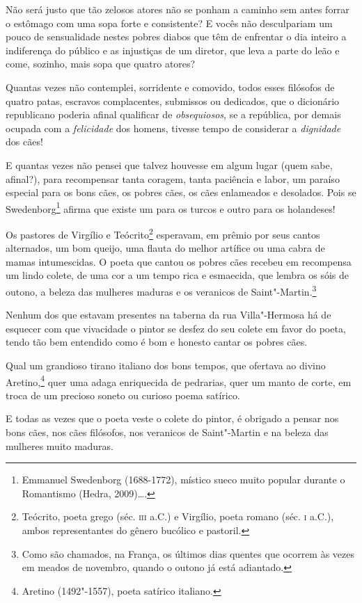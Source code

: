 Não será justo que tão zelosos atores não se ponham a caminho sem antes
forrar o estômago com uma sopa forte e consistente? E vocês não
desculpariam um pouco de sensualidade nestes pobres diabos que têm de
enfrentar o dia inteiro a indiferença do público e as injustiças de um
diretor, que leva a parte do leão e come, sozinho, mais sopa que
quatro atores?

Quantas vezes não contemplei, sorridente e comovido, todos esses
filósofos de quatro patas, escravos complacentes, submissos ou
dedicados, que o dicionário republicano poderia afinal qualificar de
\textit{obsequiosos}, se a república, por demais ocupada com a \textit{felicidade} dos
homens, tivesse tempo de considerar a \textit{dignidade} dos cães!

E quantas vezes não pensei que talvez houvesse em algum lugar (quem
sabe, afinal?), para recompensar tanta coragem, tanta paciência e
labor, um paraíso especial para os bons cães, os pobres cães, os cães
enlameados e desolados. Pois se Swedenborg\protect\footnote{ Emmanuel 
Swedenborg (1688-1772), místico sueco muito popular durante o Romantismo (Hedra, 2009)\ldots.}
afirma que existe um para os turcos e outro para os holandeses!

Os pastores de Virgílio e Teócrito\protect\footnote{ Teócrito, poeta grego (séc. 
\textsc{iii} a.C.) e Virgílio, poeta romano (séc. \textsc{i} a.C.), 
ambos representantes do gênero bucólico e pastoril.} esperavam, em
prêmio por seus cantos alternados, um bom queijo, uma flauta do melhor
artífice ou uma cabra de mamas intumescidas. O poeta que cantou os
pobres cães recebeu em recompensa um lindo colete, de uma cor a um
tempo rica e esmaecida, que lembra os sóis de outono, a beleza das
mulheres maduras e os veranicos de Saint"-Martin.\protect\footnote{ Como são chamados, na França, os
últimos dias quentes que ocorrem às vezes em meados de novembro, quando
o outono já está adiantado.}

Nenhum dos que estavam presentes na taberna da rua Villa"-Hermosa
há de esquecer com que vivacidade o pintor se desfez do seu colete em favor
do poeta, tendo tão bem entendido como é bom e honesto cantar os pobres
cães.

Qual um grandioso tirano italiano dos bons tempos, que ofertava ao divino
Aretino,\protect\footnote{ Aretino (1492"-1557), poeta satírico italiano.}
quer uma adaga enriquecida de pedrarias,
quer um manto de corte, em troca de um precioso soneto ou curioso
poema satírico.

E todas as vezes que o poeta veste o colete do pintor, é obrigado a
pensar nos bons cães, nos cães filósofos, nos veranicos de
Saint"-Martin e na beleza das mulheres muito maduras.

